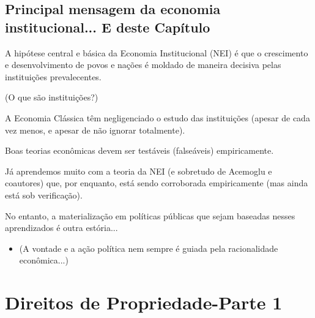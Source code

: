 \documentclass[a4paper,12pt]{article}[abntex2]
\begin{document}
\subsection{\textbf{Principal mensagem da economia institucional... E deste Capítulo}}
A hipótese central e básica da Economia Institucional (NEI) é que o crescimento e desenvolvimento de povos e nações é moldado de maneira decisiva pelas instituições prevalecentes. 

(O que são instituições?)

A Economia Clássica têm negligenciado o estudo das instituições (apesar de cada vez menos, e apesar de não ignorar totalmente). 

Boas teorias econômicas devem ser testáveis (falseáveis) empiricamente.

Já aprendemos muito com a teoria da NEI (e sobretudo de Acemoglu e coautores) que, por enquanto, está sendo corroborada empiricamente (mas ainda está sob verificação).

No entanto, a materialização em políticas públicas que sejam baseadas nesses aprendizados é outra estória... \begin{itemize}
    \item (A vontade e a ação política nem sempre é guiada pela racionalidade econômica...) 
\end{itemize}

\newpage
\section{\textbf{Direitos de Propriedade-Parte 1}}
\end{document}
